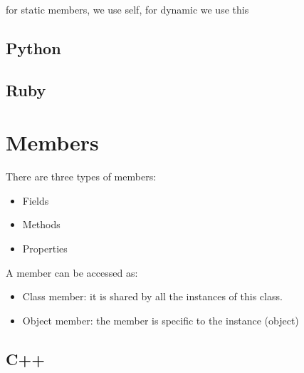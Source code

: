 \documentclass{KodeBook}
\begin{document}


for static members, we use self, for dynamic we use this

\subsection{Python}








\subsection{Ruby}







\section{Members}

There are three types of members: 
\begin{itemize}
	\item Fields
	\item Methods
	\item Properties
\end{itemize}

A member can be accessed as: 
\begin{itemize}
	\item Class member: it is shared by all the instances of this class.
	\item Object member: the member is specific to the instance (object)
\end{itemize}


\subsection{C++}
\end{document}
